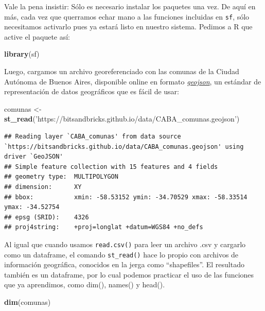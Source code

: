 \documentclass[]{book}
\newenvironment{Shaded}{\begin{snugshade}}{\end{snugshade}}
\newcommand{\KeywordTok}[1]{\textcolor[rgb]{0.13,0.29,0.53}{\textbf{#1}}}
\newcommand{\StringTok}[1]{\textcolor[rgb]{0.31,0.60,0.02}{#1}}
\newcommand{\NormalTok}[1]{#1}
\begin{document}
Vale la pena insistir: Sólo es necesario instalar los paquetes una vez.
De aquí en más, cada vez que querramos echar mano a las funciones
incluidas en \texttt{sf}, sólo necesitamos activarlo pues ya estará
listo en nuestro sistema. Pedimos a R que active el paquete así:

\begin{Shaded}
\begin{Highlighting}[]
\KeywordTok{library}\NormalTok{(sf)}
\end{Highlighting}
\end{Shaded}

Luego, cargamos un archivo georeferenciado con las comunas de la Ciudad
Autónoma de Buenos Aires, disponible online en formato
\href{https://es.wikipedia.org/wiki/GeoJSON}{\emph{geojson}}, un
estándar de representación de datos geográficos que es fácil de usar:

\begin{Shaded}
\begin{Highlighting}[]
\NormalTok{comunas <-}\StringTok{ }\KeywordTok{st_read}\NormalTok{(}\StringTok{'https://bitsandbricks.github.io/data/CABA_comunas.geojson'}\NormalTok{)}
\end{Highlighting}
\end{Shaded}

\begin{verbatim}
## Reading layer `CABA_comunas' from data source `https://bitsandbricks.github.io/data/CABA_comunas.geojson' using driver `GeoJSON'
## Simple feature collection with 15 features and 4 fields
## geometry type:  MULTIPOLYGON
## dimension:      XY
## bbox:           xmin: -58.53152 ymin: -34.70529 xmax: -58.33514 ymax: -34.52754
## epsg (SRID):    4326
## proj4string:    +proj=longlat +datum=WGS84 +no_defs
\end{verbatim}

Al igual que cuando usamos \texttt{read.csv()} para leer un archivo .csv
y cargarlo como un dataframe, el comando \texttt{st\_read()} hace lo
propio con archivos de información geográfica, conocidos en la jerga
como ``shapefiles''. El resultado también es un dataframe, por lo cual
podemos practicar el uso de las funciones que ya aprendimos, como dim(),
names() y head().

\begin{Shaded}
\begin{Highlighting}[]
\KeywordTok{dim}\NormalTok{(comunas)}
\end{Highlighting}
\end{Shaded}
\end{document}
